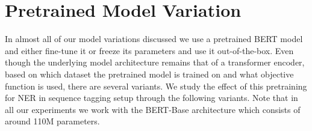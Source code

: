 


\section{Pretrained Model Variation}
In almost all of our model variations discussed we use a pretrained BERT model and either fine-tune it or freeze its parameters and use it out-of-the-box. Even though the underlying model architecture remains that of a transformer encoder, based on which dataset the pretrained model is trained on and what objective function is used, there are several variants. We study the effect of this pretraining for NER in sequence tagging setup through the following variants. Note that in all our experiments we work with the BERT-Base architecture which consists of around 110M parameters.

